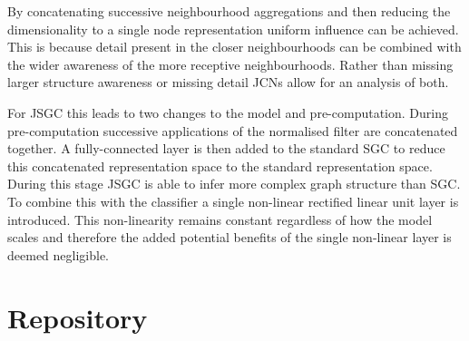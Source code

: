 By concatenating successive neighbourhood aggregations and then reducing the dimensionality to a single node representation uniform influence can be achieved.
This is because detail present in the closer neighbourhoods can be combined with the wider awareness of the more receptive neighbourhoods.
Rather than missing larger structure awareness or missing detail JCNs allow for an analysis of both.

For JSGC this leads to two changes to the model and pre-computation.
During pre-computation successive applications of the normalised filter are concatenated together.
A fully-connected layer is then added to the standard SGC to reduce this concatenated representation space to the standard representation space.
During this stage JSGC is able to infer more complex graph structure than SGC.
To combine this with the classifier a single non-linear rectified linear unit layer is introduced.
This non-linearity remains constant regardless of how the model scales and therefore the added potential benefits of the single non-linear layer is deemed negligible.

\section{Repository}
